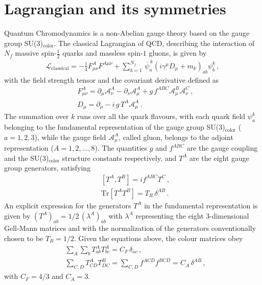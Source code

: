 \section{Lagrangian and its symmetries}
%
Quantum Chromodynamics is a non-Abelian gauge theory based on the gauge group SU(3)$_\text{color}$.
The classical Lagrangian of QCD, describing the interaction of $N_f$ massive spin-$\frac{1}{2}$ quarks
and massless spin-$1$ gluons, is given by
\begin{align}
    \label{eq:QCD_lagrangian}
    \mathcal{L}_{\mathrm{classical}} = -\frac{1}{4}F^{A}_{\mu\nu}F^{A\mu\nu} + 
    \sum_{k=1}^{N_f}\,{\overline{\psi}}^{\,k}_a\left(i\gamma^{\mu}D_{\mu} + m_k\right)_{ab}\psi^k_b\,,
\end{align}
with the field strength tensor and the covariant derivative defined as
\begin{align}
    \label{eq:field_strength_thensor}
    &F^{A}_{\mu\nu} = \partial_{\mu} \mathcal{A}^A_{\nu} - \partial_{\nu} \mathcal{A}^A_{\mu} 
    + g \, f^{ABC} \mathcal{A}^B_{\mu}\mathcal{A}^C_{\nu}\,, \\
    \label{eq:covariant_derivateive}
    &D_{\mu} = \partial_{\mu} - i\,g\,T^A \mathcal{A}^{A}_{\mu}\,.
\end{align}
The summation over $k$ runs over all the quark flavours, with
each quark field $\psi^k_a$ belonging to the fundamental representation of the gauge group SU(3)$_\text{color}$ ($a=1,2,3$),
while the gauge field $\mathcal{A}^A_{\mu}$, called gluon, belongs to the adjoint representation
($A=1,2,...,8$). The quantities $g$ and $f^{ABC}$ are the gauge coupling and the SU(3)$_\text{color}$ structure constants
respectively, and $T^A$ are the eight gauge group generators, satisfying
\begin{align}
    \label{eq:algebra}
    &\left[T^A,T^B\right] = i f^{ABC} T^C\,, \\
    \label{eq:normalization_SU3_generators}
    &\text{Tr}\left[T^A T^B\right] = T_R\, \delta^{AB}\,.
\end{align} 
An explicit expression for the generators $T^A$ in the fundamental representation is given by
$(T^A)_{ab} = 1/2\,\left(\lambda^A\right)_{ab}$ with $\lambda^A$ representing the eight 3-dimensional Gell-Mann matrices
and with the normalization of the generators conventionally chosen to be $T_R = 1/2$.
Given the equations above, the colour matrices obey
\begin{align}
    \label{eq:SU3_generators_relations}
    &\sum_A\sum_b T^A_{ab} T^A_{bc} = C_F\, \delta_{ac}\,,\\
    &\sum_{C,D} T^A_{CD} T^B_{DC} = \sum_{C,D} f^{ACD} f^{BCD} =  C_A\, \delta^{AB}\,,
\end{align}
with $C_F= 4/3$ and $C_A= 3$.

